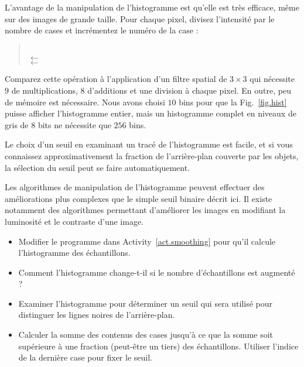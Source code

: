 L'avantage de la manipulation de l'histogramme est qu'elle est très efficace, même sur des images de grande taille. Pour chaque pixel, divisez l'intensité par le nombre de cases et incrémentez le numéro de la case :
\begin{quote}
\\
\hspace*{2em} $\leftarrow$ \\
\hspace*{2em} $\leftarrow$ 
\end{quote}
Comparez cette opération à l'application d'un filtre spatial de $3\times 3$ qui nécessite $9$ de multiplications, $8$ d'additions et une division à chaque pixel. En outre, peu de mémoire est nécessaire. Nous avons choisi $10$ bins pour que la Fig.~\ref{fig.hist} puisse afficher l'histogramme entier, mais un histogramme complet en niveaux de gris de $8$ bits ne nécessite que $256$ bins.

Le choix d'un seuil en examinant un tracé de l'histogramme est facile, et si vous connaissez approximativement la fraction de l'arrière-plan couverte par les objets, la sélection du seuil peut se faire automatiquement.

Les algorithmes de manipulation de l'histogramme peuvent effectuer des améliorations plus complexes que le simple seuil binaire décrit ici. Il existe notamment des algorithmes permettant d'améliorer les images en modifiant la luminosité et le contraste d'une image. 

\begin{framed}
\begin{itemize}
\item Modifier le programme dans Activity~\ref{act.smoothing} pour qu'il calcule l'histogramme des échantillons.
\item Comment l'histogramme change-t-il si le nombre d'échantillons est augmenté ?
\item Examiner l'histogramme pour déterminer un seuil qui sera utilisé pour distinguer les lignes noires de l'arrière-plan.
\item Calculer la somme des contenus des cases jusqu'à ce que la somme soit supérieure à une fraction (peut-être un tiers) des échantillons. Utiliser l'indice de la dernière case pour fixer le seuil.
\end{itemize}
\end{framed}

